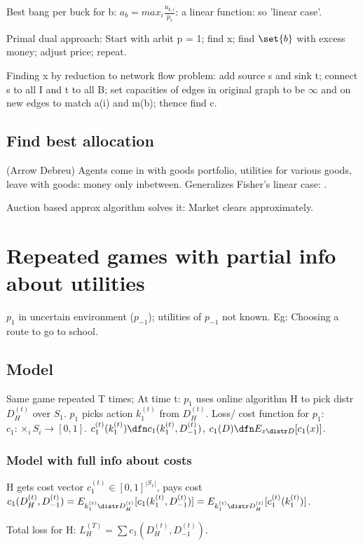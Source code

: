 \documentclass[oneside, article]{memoir}
\begin{document}
Best bang per buck for b: $a_{b} = max_{i}\frac{u_{b, i}}{p_{i}}$: a linear function: so 'linear case'.

Primal dual approach: Start with arbit p = 1; find x; find $\set{b}$ with excess money; adjust price; repeat.

Finding x by reduction to network flow problem: add source s and sink t; connect s to all I and t to all B; set capacities of edges in original graph to be $\infty$ and on new edges to match a(i) and m(b); thence find c.

\subsection{Find best allocation}
(Arrow Debreu) Agents come in with goods portfolio, utilities for various goods, leave with goods: money only inbetween. Generalizes Fisher's linear case: .

Auction based approx algorithm solves it: Market clears approximately.

\section{Repeated games with partial info about utilities}
$p_{1}$ in uncertain environment ($p_{-1}$); utilities of $p_{-1}$ not known. Eg: Choosing a route to go to school.

\subsection{Model}
Same game repeated T times; At time t:
$p_{1}$ uses online algorithm H to pick distr $D_{H}^{(t)}$ over $S_{1}$. $p_{1}$ picks action $k_{1}^{(t)}$ from $D_{H}^{(t)}$. Loss/ cost function for $p_{1}$: $c_{1}:\times_{i}S_{i} \to [0,1]$. $c_{1}^{(t)}(k_{1}^{(t)}) \dfn c_{1}(k_{1}^{(t)}, D_{-1}^{(t)})$, $c_{1}(D) \dfn E_{x \distr D}[c_{1}(x)]$.

\subsubsection{Model with full info about costs}
H gets cost vector $c_{1}^{(t)} \in [0,1]^{|S_{1}|}$, pays cost \\
$c_{1}(D_{H}^{(t)}, D_{-1}^{(t)}) = E_{k_{1}^{(t)} \distr D_{H}^{(t)}}[c_{1}(k_{1}^{(t)}, D_{-1}^{(t)})] = E_{k_{1}^{(t)} \distr D_{H}^{(t)}}[c_{1}^{(t)}(k_{1}^{(t)})]$.

Total loss for H: $L_{H}^{(T)} = \sum c_{1}(D_{H}^{(t)}, D_{-1}^{(t)})$.
\end{document}
